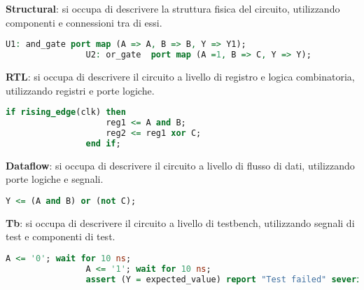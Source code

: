             \textbf{Structural}: si occupa di descrivere la struttura fisica del circuito, utilizzando componenti e connessioni tra di essi.
            \begin{lstlisting}[language=VHDL]
                U1: and_gate port map (A => A, B => B, Y => Y1);
                U2: or_gate  port map (A =1, B => C, Y => Y);
            \end{lstlisting}

            \textbf{RTL}: si occupa di descrivere il circuito a livello di registro e logica combinatoria, utilizzando registri e porte logiche.
            \begin{lstlisting}[language=VHDL]
                if rising_edge(clk) then
                    reg1 <= A and B;
                    reg2 <= reg1 xor C;
                end if;
            \end{lstlisting}

            \textbf{Dataflow}: si occupa di descrivere il circuito a livello di flusso di dati, utilizzando porte logiche e segnali.
            \begin{lstlisting}[language=VHDL]
                Y <= (A and B) or (not C);
            \end{lstlisting}

            \textbf{Tb}: si occupa di descrivere il circuito a livello di testbench, utilizzando segnali di test e componenti di test.
            \begin{lstlisting}[language=VHDL]
                A <= '0'; wait for 10 ns;
                A <= '1'; wait for 10 ns;
                assert (Y = expected_value) report "Test failed" severity error;
            \end{lstlisting}

